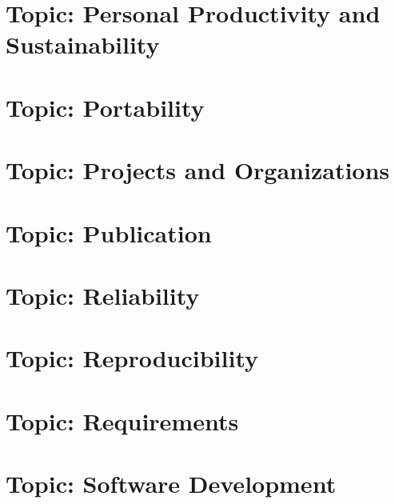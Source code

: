 \documentclass[twoside]{book}
\newcommand{\+}{\discretionary{\mbox{\scriptsize$\hookleftarrow$}}{}{}}
\begin{document}
\chapter{Topic\+: Personal Productivity and Sustainability}
\label{md_markdown_topic_personal_productivity_and_sustainability}

\chapter{Topic\+: Portability}
\label{md_markdown_topic_portability}

\chapter{Topic\+: Projects and Organizations}
\label{md_markdown_topic_projects_and_organizations}

\chapter{Topic\+: Publication}
\label{md_markdown_topic_publication}

\chapter{Topic\+: Reliability}
\label{md_markdown_topic_reliability}

\chapter{Topic\+: Reproducibility}
\label{md_markdown_topic_reproducibility}

\chapter{Topic\+: Requirements}
\label{md_markdown_topic_requirements}

\chapter{Topic\+: Software Development}
\label{md_markdown_topic_software_development}

\end{document}
